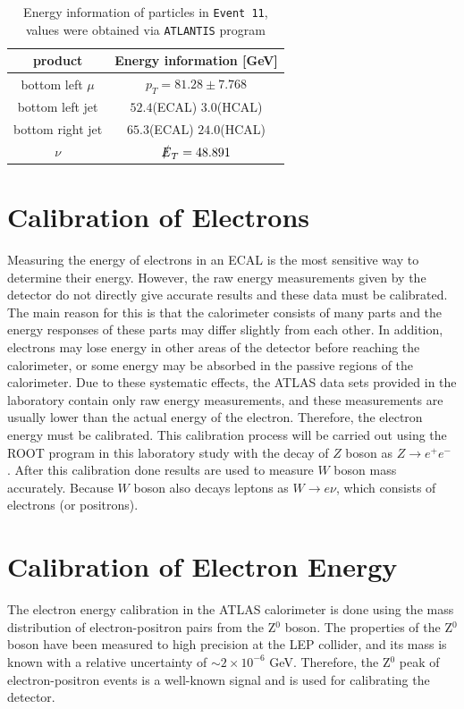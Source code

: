 \begin{table}[h]
		\centering
        \begin{tabular}{cc}
            \toprule
             product & Energy information [GeV]  \\
            \midrule
            bottom left $\mu$ & $p_T = 81.28 \pm 7.768$  \\
  			\midrule
  			bottom left jet & $ 52.4$(ECAL)  $ 3.0$(HCAL) \\
  			\midrule
  			bottom right jet & $ 65.3$(ECAL)  $ 24.0$(HCAL) \\
  			\midrule
			$\nu$ & $\slashed{E}_T = 48.891$ \\
			\bottomrule
        \end{tabular}
        \caption{Energy information of particles in \texttt{Event 11}, values were obtained via \texttt{ATLANTIS} program}
        \label{tab:event11}
    \end{table}
\FloatBarrier

\section{Calibration of Electrons}
Measuring the energy of electrons in an ECAL is the most sensitive way to determine their energy. However, the raw energy measurements given by the detector do not directly give accurate results and these data must be calibrated. The main reason for this is that the calorimeter consists of many parts and the energy responses of these parts may differ slightly from each other. In addition, electrons may lose energy in other areas of the detector before reaching the calorimeter, or some energy may be absorbed in the passive regions of the calorimeter. Due to these systematic effects, the ATLAS data sets provided in the laboratory contain only raw energy measurements, and these measurements are usually lower than the actual energy of the electron. Therefore, the electron energy must be calibrated. This calibration process will be carried out using the ROOT program in this laboratory study with the decay of $Z$ boson as $Z\rightarrow e^+e^-$ \cite{atlaslabmanual}. After this calibration done results are used to measure $W$ boson mass accurately. Because $W$ boson also decays leptons as $W\rightarrow e\nu$, which consists of electrons (or positrons).

\section{Calibration of Electron Energy}
\label{electroncalibration}
The electron energy calibration in the ATLAS calorimeter is done using the mass distribution of electron-positron pairs from the Z$^0$ boson. The properties of the Z$^0$ boson have been measured to high precision at the LEP collider, and its mass is known with a relative uncertainty of $\sim 2 \times 10^{-6}$ GeV. Therefore, the Z$^0$ peak of electron-positron events is a well-known signal and is used for calibrating the detector.

